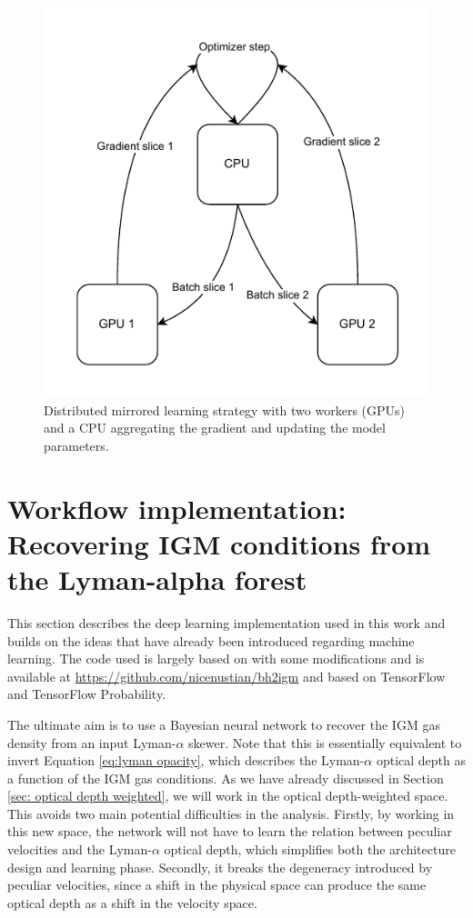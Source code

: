 \begin{figure}
    \centering
    \includegraphics[width=0.6\linewidth]{img/ML/mirror_training.drawio.pdf}
    \caption{Distributed mirrored learning strategy with two workers (GPUs) and a CPU aggregating the gradient and updating the model parameters.}
    \label{fig:ML mirror training}
\end{figure}

\section{Workflow implementation: Recovering IGM conditions from the Lyman-alpha forest }
This section describes the deep learning implementation used in this work and builds on the ideas that have already been introduced regarding machine learning. The code used is largely based on \cite{nasir2024deep} with some modifications and is available at \url{https://github.com/nicenustian/bh2igm} and based on TensorFlow and TensorFlow Probability.


The ultimate aim is to use a Bayesian neural network to recover the IGM gas density from an input Lyman-$\alpha$ skewer. Note that this is essentially equivalent to invert Equation \ref{eq:lyman opacity}, which describes the Lyman-$\alpha$ optical depth as a function of the IGM gas conditions. As we have already discussed in Section \ref{sec: optical depth weighted}, we will work in the optical depth-weighted space. This avoids two main potential difficulties in the analysis. Firstly, by working in this new space, the network will not have to learn the relation between peculiar velocities and the Lyman-$\alpha$ optical depth, which simplifies both the architecture design and learning phase. Secondly, it breaks the degeneracy introduced by peculiar velocities, since a shift in the physical space can produce the same optical depth as a shift in the velocity space.

